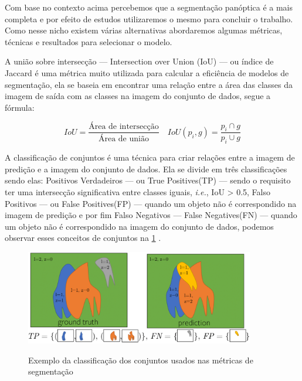 Com base no contexto acima percebemos que a segmentação panóptica é a mais completa e por efeito de estudos utilizaremos o mesmo para concluir o trabalho. Como nesse nicho existem várias alternativas abordaremos algumas métricas, técnicas e resultados para selecionar o modelo.


A união sobre intersecção — Intersection over Union (IoU) — ou índice de Jaccard é uma métrica muito utilizada para calcular a eficiência de modelos de segmentação, ela se baseia em encontrar uma relação entre a área das classes da imagem de saída com as classes na imagem do conjunto de dados, segue a fórmula\cite{dp_semantic_segmantation, lapix, kirillov2019panoptic}:

\begin{equation}	
	IoU = \frac{\text{Área de intersecção}}{\text{Área de união}} \quad IoU(p_i, g) = \frac{p_i \cap g}{ p_i \cup g}
\end{equation}



A classificação de conjuntos é uma técnica para criar relações entre a imagem de predição e a imagem do conjunto de dados. Ela se divide em três classificações sendo elas: Positivos Verdadeiros — ou True Positives(TP) — sendo o requisito ter uma intersecção significativa entre classes iguais, \emph{i.e.}, IoU > 0.5, Falso Positivos — ou False Positives(FP) — quando um objeto não é correspondido na imagem de predição e por fim Falso Negativos — False Negatives(FN) — quando um objeto não é correspondido na imagem do conjunto de dados, podemos observar esses conceitos de conjuntos na \cref{fig:conjuntos} \cite{kirillov2019panoptic}.
\begin{figure}[H]
	\caption{Exemplo da classificação dos conjuntos usados nas métricas de segmentação}
	\centering %
	\includegraphics[width=10cm]{figures/pan_metric.png} %
	\label{fig:conjuntos}
\end{figure}


